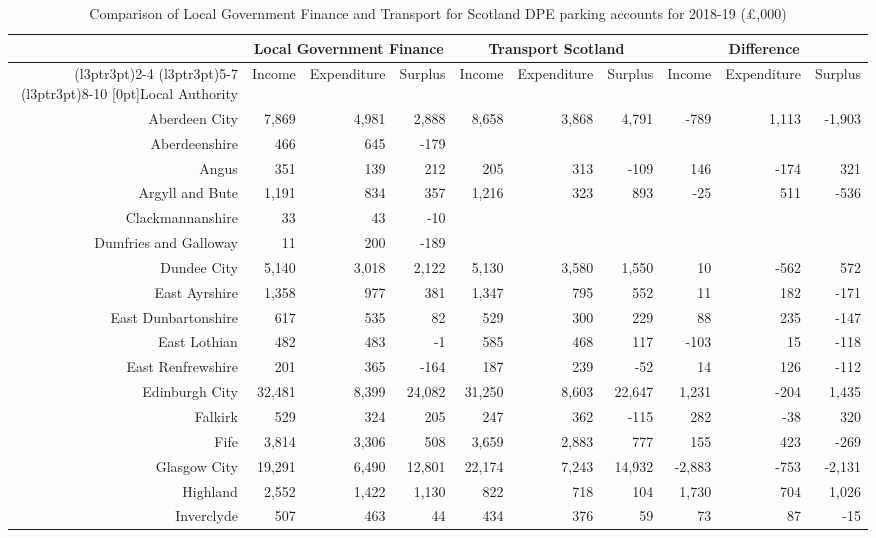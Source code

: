 \documentclass[
  12pt,
]{article}
\begin{document}
\begin{landscape}
\begin{table}[H]
\caption{\label{tab:comparetab}Comparison of Local Government Finance and Transport for Scotland DPE parking accounts for 2018-19 (£,000)}
\centering
\fontsize{7}{9}\selectfont
\begin{tabular}[t]{rrrrrrrrrr}
\toprule
\multicolumn{1}{c}{ } & \multicolumn{3}{c}{Local Government Finance} & \multicolumn{3}{c}{Transport Scotland} & \multicolumn{3}{c}{Difference} \\
\cmidrule(l{3pt}r{3pt}){2-4} \cmidrule(l{3pt}r{3pt}){5-7} \cmidrule(l{3pt}r{3pt}){8-10}
\multirow{1}{*}[0pt]{Local Authority} & Income & Expenditure & Surplus & Income & Expenditure & Surplus & Income & Expenditure & Surplus\\
\midrule
Aberdeen City & 7,869 & 4,981 & 2,888 & 8,658 & 3,868 & 4,791 & -789 & 1,113 & -1,903\\
Aberdeenshire & 466 & 645 & -179 &  &  &  &  &  & \\
Angus & 351 & 139 & 212 & 205 & 313 & -109 & 146 & -174 & 321\\
Argyll and Bute & 1,191 & 834 & 357 & 1,216 & 323 & 893 & -25 & 511 & -536\\
Clackmannanshire & 33 & 43 & -10 &  &  &  &  &  & \\
Dumfries and Galloway & 11 & 200 & -189 &  &  &  &  &  & \\
Dundee City & 5,140 & 3,018 & 2,122 & 5,130 & 3,580 & 1,550 & 10 & -562 & 572\\
East Ayrshire & 1,358 & 977 & 381 & 1,347 & 795 & 552 & 11 & 182 & -171\\
East Dunbartonshire & 617 & 535 & 82 & 529 & 300 & 229 & 88 & 235 & -147\\
East Lothian & 482 & 483 & -1 & 585 & 468 & 117 & -103 & 15 & -118\\
East Renfrewshire & 201 & 365 & -164 & 187 & 239 & -52 & 14 & 126 & -112\\
Edinburgh City & 32,481 & 8,399 & 24,082 & 31,250 & 8,603 & 22,647 & 1,231 & -204 & 1,435\\
Falkirk & 529 & 324 & 205 & 247 & 362 & -115 & 282 & -38 & 320\\
Fife & 3,814 & 3,306 & 508 & 3,659 & 2,883 & 777 & 155 & 423 & -269\\
Glasgow City & 19,291 & 6,490 & 12,801 & 22,174 & 7,243 & 14,932 & -2,883 & -753 & -2,131\\
Highland & 2,552 & 1,422 & 1,130 & 822 & 718 & 104 & 1,730 & 704 & 1,026\\
Inverclyde & 507 & 463 & 44 & 434 & 376 & 59 & 73 & 87 & -15\\

\end{tabular}
\end{table}
\end{landscape}
\end{document}

